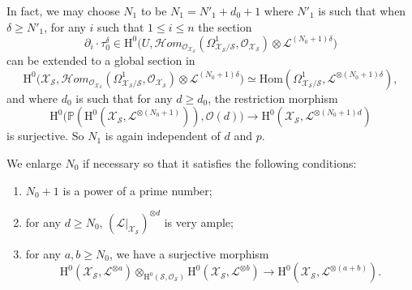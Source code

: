 \documentclass[JEP,XML,SOM,Unicode,published]{cedram}
\newcommand{\cHom}{\mathcal{H}\!om}
\theoremstyle{plain}
\theoremstyle{definition}
\newcommand{\ho}{\mathrm{H}}
\newcommand{\Hom}{\mathrm{Hom}}
\newcommand{\X}{\mathcal{X}}
\newcommand{\li}{\mathcal{L}}
\newcommand{\pr}{\mathbb{P}}
\begin{document}
In fact, we may choose $N_1$ to be $N_1\!=\!N'_1+d_0+1$ where $N'_1$ is such that when \hbox{$\delta\!\geq\!N'_1$}, for any $i$ such that $1\leq i\leq n$ the section\vspace*{-3pt}
\[
\partial_i\cdot \tau_0^{\delta}\in \ho^0\bigl(U, \cHom_{\mathcal{O}_{\X_\mathcal{S}}}(\Omega^1_{\X_\mathcal{S}/\mathcal{S}}, \mathcal{O}_{\X_\mathcal{S}})\otimes \li^{(N_0+1)\delta} \bigr)
\]
can be extended to a global section in\vspace*{-3pt}
\[
\ho^0\bigl(\X_\mathcal{S}, \cHom_{\mathcal{O}_{\X_\mathcal{S}}}(\Omega^1_{\X_\mathcal{S}/\mathcal{S}}, \mathcal{O}_{\X_\mathcal{S}})\otimes \li^{(N_0+1)\delta} \bigr)\simeq \Hom(\Omega^1_{\X_\mathcal{S}/\mathcal{S}}, \li^{\otimes(N_0+1)\delta}),
\]
and where $d_0$ is such that for any $d\geq d_0$, the restriction morphism
\[
\ho^0\bigl(\pr(\ho^0(\X_{\mathcal{S}}, \li^{\otimes (N_0+1)})),\mathcal{O}(d)\bigr) \to \ho^0(\X_{\mathcal{S}}, \li^{\otimes (N_0+1)d})
\]
is surjective. So $N_1$ is again independent of $d$ and $p$.

We enlarge $N_0$ if necessary so that it satisfies the following conditions:
\begin{enumerate}
\item $N_0+1$ is a power of a prime number;
\item for any $d\geq N_0$, $(\li |_{\X_\mathcal{S}})^{\otimes d}$ is very ample;
\item for any $a,b\geq N_0$, we have a surjective morphism
\[
\ho^0(\X_{\mathcal{S}}, \li^{\otimes a}) \otimes_{\ho^0(\mathcal{S}, \mathcal{O}_{\mathcal{S}})}\ho^0(\X_{\mathcal{S}}, \li^{\otimes b})\to \ho^0(\X_{\mathcal{S}}, \li^{\otimes (a+b)}).
\]
\end{enumerate}
\end{document}

